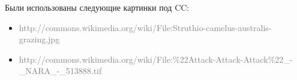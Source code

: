 \documentclass[10pt]{beamer}
\newcommand{\light}[1]{\textcolor{gray}{\footnotesize{#1}}}
\begin{document}
\begin{frame}{}
  Были использованы следующие картинки под CC:
  \begin{itemize}
  \item \light{http://commons.wikimedia.org/wiki/File:Struthio-camelus-australis-grazing.jpg}
  \item \light{http://commons.wikimedia.org/wiki/File:\%22Attack-Attack-Attack\%22\_-\_NARA\_-\_513888.tif}
  \end{itemize}
\end{frame}
\end{document}
